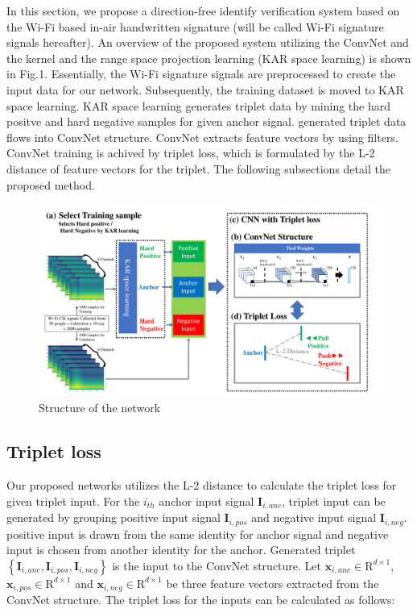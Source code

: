 \documentclass[runningheads]{llncs}
\begin{document}
In this section, we propose a direction-free identify verification system based on the Wi-Fi based in-air handwritten signature (will be called Wi-Fi signature signals hereafter). An overview of the proposed system utilizing the ConvNet \cite{lecun1998gradient} and the kernel and the range space projection learning (KAR space learning) \cite{toh2018learning,toh2018gradient} is shown in Fig.1.
Essentially, the Wi-Fi signature signals are preprocessed to create the input data for our network. Subsequently, the training dataset is moved to KAR space learning. KAR space learning generates triplet data by mining the hard positve and hard negative samples for given anchor signal.
generated triplet data flows into ConvNet structure. ConvNet extracts feature vectors by using filters.
ConvNet training is achived by triplet loss, which is formulated by the L-2 distance of feature vectors for the triplet. 
The following subsections detail the proposed method.

\begin{figure}
    \includegraphics[width=\textwidth]{fig1_network_structure.pdf}
    \caption{Structure of the network} \label{fig1}
\end{figure}


\subsection{Triplet loss}

Our proposed networks utilizes the L-2 distance to calculate the triplet loss for given triplet input. For the $i_{th}$ anchor input signal $\mathbf{I}_{i,anc}$, triplet input can be generated by grouping positive input signal $\mathbf{I}_{i,pos}$ and negative input signal $\mathbf{I}_{i,neg}$.
positive input is drawn from the same identity for anchor signal and negative input is chosen from another identity for the anchor.
Generated triplet $\left\{\mathbf{I}_{i,anc},\mathbf{I}_{i,pos},\mathbf{I}_{i,neg}\right\}$ is the input to the ConvNet structure.
Let $\mathbf{x}_{i,anc}\in{\mathrm{R}}^{d\times1}$, $\mathbf{x}_{i,pos}\in{\mathrm{R}}^{d\times1}$ and $\mathbf{x}_{i,neg}\in{\mathrm{R}}^{d\times1}$ be three feature vectors extracted from the ConvNet structure. The triplet loss for the inputs can be calculated as follows:
\end{document}
